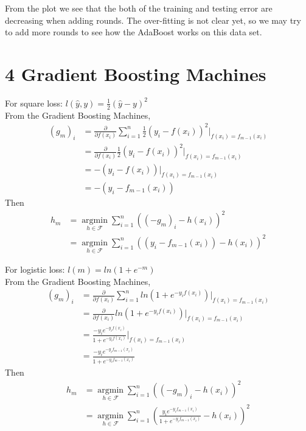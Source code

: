 \documentclass{article}
\newenvironment{problem}[2][$\bullet$]{\begin{trivlist}\large
		\item[\hskip \labelsep {\bfseries #1}\hskip \labelsep {\bfseries #2.}]}  {\end{trivlist}}
\begin{document}
From the plot we see that the both of the training and testing error are decreasing when adding rounds. The over-fitting is not clear yet, so we may try to add more rounds to see how the AdaBoost works on this data set.

\section{4 Gradient Boosting Machines}
\begin{problem}{4.1}
\end{problem} 

For square loss: $l(\hat{y},y) = \frac{1}{2}(\hat{y} - y)^2$\\
From the Gradient Boosting Machines, 
\begin{align}
(g_m)_i &= \frac{\partial}{\partial f(x_i)} \sum_{i=1}^{n}\frac{1}{2}(y_i - f(x_i))^2 \vert_{f(x_i) = f_{m-1}(x_i)}\\
&= \frac{\partial}{\partial f(x_i)} \frac{1}{2}(y_i - f(x_i))^2 \vert_{f(x_i) = f_{m-1}(x_i)}\\
&= -(y_i - f(x_i)) \vert_{f(x_i) = f_{m-1}(x_i)}\\
&= -(y_i - f_{m-1}(x_i))
\end{align}
Then \begin{align}
h_m &=  \underset{h \in \mathcal{F}}{\operatorname{arg min}} \sum_{i=1}^{n} ((-g_m)_i - h(x_i))^2\\
 &=  \underset{h \in \mathcal{F}}{\operatorname{arg min}} \sum_{i=1}^{n} ((y_i - f_{m-1}(x_i)) - h(x_i))^2
\end{align}

\begin{problem}{4.2}
\end{problem}
For logistic loss: $l(m) = ln(1+e^{-m})$\\
From the Gradient Boosting Machines, 
\begin{align}
(g_m)_i &= \frac{\partial}{\partial f(x_i)} \sum_{i=1}^{n}ln(1+ e^{-y_if(x_i)}) \vert_{f(x_i) = f_{m-1}(x_i)}\\
&= \frac{\partial}{\partial f(x_i)} ln(1+ e^{-y_if(x_i)}) \vert_{f(x_i) = f_{m-1}(x_i)}\\
&= \frac{-y_ie^{-y_if(x_i)}}{1+e^{-y_if(x_i)}} \vert_{f(x_i) = f_{m-1}(x_i)} \\
&=  \frac{-y_ie^{-y_if_{m-1}(x_i)}}{1+e^{-y_if_{m-1}(x_i)}}
\end{align}
Then\begin{align}
h_m &=  \underset{h \in \mathcal{F}}{\operatorname{arg min}} \sum_{i=1}^{n} ((-g_m)_i - h(x_i))^2\\
 &=  \underset{h \in \mathcal{F}}{\operatorname{arg min}} \sum_{i=1}^{n} ( \frac{y_ie^{-y_if_{m-1}(x_i)}}{1+e^{-y_if_{m-1}(x_i)}}- h(x_i))^2
\end{align}
\end{document}
